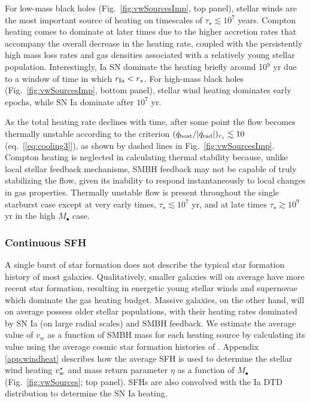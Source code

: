 \documentclass[usenatbib,fleqn]{mn2e}
\newcommand{\rs}{r_s}
\newcommand{\vwO}{v_{w}}
\begin{document}
For low-mass black holes (Fig.~\ref{fig:vwSourcesImp}, top panel),
stellar winds are the most important source of heating on timescales
of $\tau_{\star} \lesssim 10^{7}$ years.  Compton heating comes to
dominate at later times due to the higher accretion rates that
accompany the overall decrease in the heating rate, coupled with the
persistently high mass loss rates and gas densities associated with a
relatively young stellar population.  Interestingly, Ia SN dominate
the heating briefly around 10$^{9}$ yr due to a window of time in
which $r_{ \rm Ia} < \rs$.  For high-mass black holes
(Fig.~\ref{fig:vwSourcesImp}, bottom panel), stellar wind heating
dominates early epochs, while SN Ia dominate after $10^{7}$ yr.

As the total heating rate declines with time, after some point the
flow becomes thermally unstable according to the criterion
$(\dot{q}_{\rm heat}/|\dot{q}_{\rm rad}|)_{r_{s}} \lesssim 10$
(eq.~[\ref{eq:cooling3}]), as shown by dashed lines in
Fig.~\ref{fig:vwSourcesImp}.  Compton heating is neglected in
calculating thermal stability because, unlike local stellar feedback
mechanisms, SMBH feedback may not be capable of truly stabilizing the
flow, given its inability to respond instantaneously to local changes
in gas properties.  Thermally unstable flow is present
throughout the single starburst case except at very early times,
$\tau_{\star} \lesssim 10^7$ yr, and at late times $\tau_{\star}
\gtrsim 10^{9}$ yr in the high $M_{\bullet}$ case.

\subsubsection{Continuous SFH}
A single burst of star formation does not describe the typical star
formation history of most galaxies.  Qualitatively, smaller galaxies
will on average have more recent star formation, resulting in
energetic young stellar winds and supernovae which dominate the gas
heating budget.  Massive galaxies, on the other hand, will on average
possess older stellar populations, with their heating rates dominated
by SN Ia (on large radial scales) and SMBH feedback.  We estimate the
average value of $\vwO$ as a function of SMBH mass for each heating
source by calculating its value using the average cosmic star
formation histories of \citet{MosterNaab+:2013a}.  Appendix
\ref{app:windheat} describes how the average SFH is
used to determine the stellar wind heating $v_{\rm w}^{\star}$ and
mass return parameter $\eta$ as a function of $M_{\bullet}$
(Fig.~\ref{fig:vwSources}; top panel).  SFHs are also
convolved with the Ia DTD distribution to determine the SN Ia heating.
\end{document}
